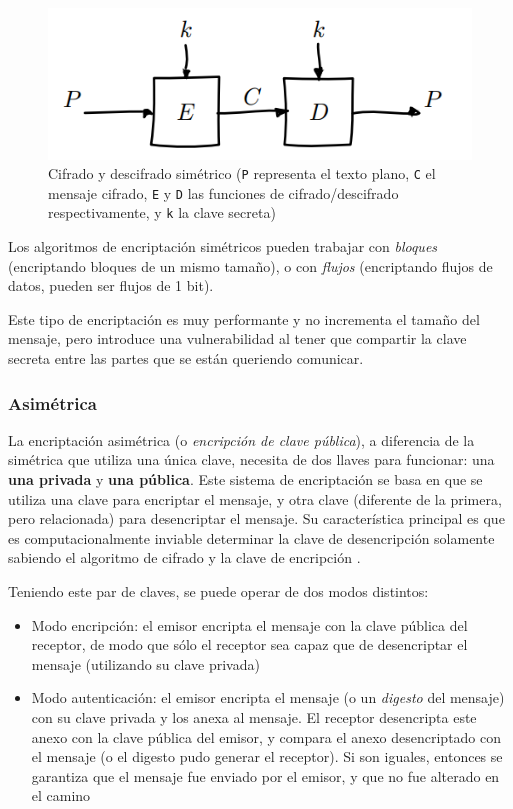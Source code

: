 \begin{figure}[H]
    \centering
    \includegraphics[width=0.8\linewidth]{images/van-houvten-simetrico.png}
    \caption*{Cifrado y descifrado simétrico (\texttt{P} representa el texto plano, \texttt{C} el mensaje cifrado, \texttt{E} y \texttt{D} las funciones de cifrado/descifrado respectivamente, y \texttt{k} la clave secreta) \autocite{VanhouvtenBlockCiphers}}
\end{figure}

Los algoritmos de encriptación simétricos pueden trabajar con \emph{bloques} (encriptando bloques de un mismo tamaño), o con \emph{flujos} (encriptando flujos de datos, pueden ser flujos de 1 bit).  

Este tipo de encriptación es muy performante y no incrementa el tamaño del mensaje, pero introduce una vulnerabilidad al tener que compartir la clave secreta entre las partes que se están queriendo comunicar.

\subsubsection{Asimétrica}

La encriptación asimétrica (o \emph{encripción de clave pública}), a diferencia de la simétrica que utiliza una única clave, necesita de dos llaves para funcionar: una \textbf{una privada} y \textbf{una pública}.  
Este sistema de encriptación se basa en que se utiliza una clave para encriptar el mensaje, y otra clave (diferente de la primera, pero relacionada) para desencriptar el mensaje. Su característica principal es que es computacionalmente inviable determinar la clave de desencripción solamente sabiendo el algoritmo de cifrado y la clave de encripción \autocite{StallingsPublicKeyPrinciples}.

Teniendo este par de claves, se puede operar de dos modos distintos:

\begin{itemize}
    \item Modo encripción: el emisor encripta el mensaje con la clave pública del receptor, de modo que sólo el receptor sea capaz que de desencriptar el mensaje (utilizando su clave privada)
    \item Modo autenticación: el emisor encripta el mensaje (o un \emph{digesto} del mensaje) con su clave privada y los anexa al mensaje. El receptor desencripta este anexo con la clave pública del emisor, y compara el anexo desencriptado con el mensaje (o el digesto pudo generar el receptor). Si son iguales, entonces se garantiza que el mensaje fue enviado por el emisor, y que no fue alterado en el camino
\end{itemize}

